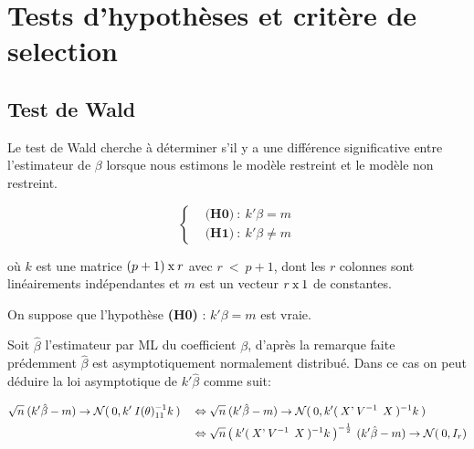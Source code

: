 \documentclass[11pt,fleqn]{book} %
\begin{document}
\newpage



\chapter{Tests d'hypothèses et critère de selection}



\section{Test de Wald}

\vspace{1em} 

Le test de Wald cherche à déterminer s’il y a une différence significative entre l'estimateur de $\beta$ lorsque nous estimons le modèle restreint et le modèle non restreint.

\vspace{1em}

\begin{equation*}
\left\{\begin{aligned} & \textbf{(H0)} \: : \: k'\beta=m \\
 & \textbf{(H1)} \: : \: k'\beta\neq m \end{aligned} \right.
\end{equation*}

\vspace{0.5em}

où $k$ est une matrice $(p+1)\:\textnormal{x}\:r$ \: avec $ r\:<\:p+1 $, dont les $r$ colonnes sont linéairements indépendantes et $m$ est un vecteur $r\:\textnormal{x}\: 1$ de constantes.

\vspace{1em}

On suppose que l'hypothèse \textbf{(H0)} : $k'\beta=m$ est vraie.

\vspace{1em}
  
Soit $\hat{\beta}$ l'estimateur par ML du coefficient $\beta$, d'après la remarque faite prédemment $\hat{\beta}$ est asymptotiquement normalement distribué. Dans ce cas on peut déduire la loi asymptotique de $k'\hat{\beta}$ comme suit:


\begin{align*}
 \sqrt{n}\:(k'\hat{\beta}-m)\rightarrow \mathcal{N}(\:0,k'\:I(\theta)_{11}^{-1} k\:) \quad
 &\Leftrightarrow \sqrt{n}\:(k'\hat{\beta}-m)\rightarrow \mathcal{N}(\:0,k' (\:X\textnormal{'} \:V^{-1}\:\: X\:)^{-1} k\:)\\
 &\Leftrightarrow  \sqrt{n} \left(\:k' (\:X\textnormal{'} \:V^{-1}\:\: X\:)^{-1} k\:\right)^{-\frac{1}{2}} \:(k'\hat{\beta}-m) \rightarrow \mathcal{N}(\:0,I_r)
 \end{align*}
 
\end{document}
